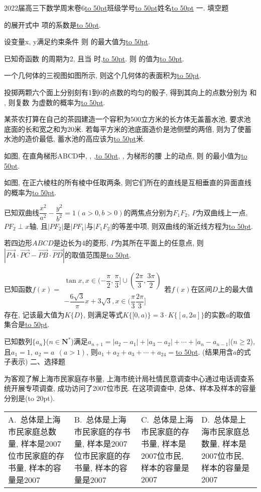 \documentclass[10pt,a4paper]{article}
\newcommand{\blank}[1]{\underline{\hbox to #1pt{}}}
\newcommand{\bracket}[1]{(\hbox to #1pt{})}
\newcommand{\fourch}[4]{\par\begin{tabular}{p{.23\textwidth}p{.23\textwidth}p{.23\textwidth}p{.23\textwidth}}
A.~#1 &B.~#2& C.~#3& D.~#4
\end{tabular}}
\begin{document}
2022届高三下数学周末卷6\blank{50}班级学号\blank{50}姓名\blank{50}
一. 填空题
\item 的展开式中 项的系数是\blank{50}.
\item 设变量x, y满足约束条件 则 的最大值为\blank{50}.
\item 已知奇函数 的周期为2, 且当 时,\blank{50}. 则 的值为\blank{50}.
\item 一个几何体的三视图如图所示, 则这个几何体的表面积为\blank{50}.
\item 投掷两颗六个面上分别刻有1到6的点数的均匀的骰子, 得到其向上的点数分别为 和 , 则复数  为虚数的概率为\blank{50}.
\item 某茶农打算在自己的茶园建造一个容积为500立方米的长方体无盖蓄水池, 要求池底面的长和宽之和为20米. 若每平方米的池底面造价是池侧壁的两倍, 则为了使蓄水池的造价最低, 蓄水池的高应该为\blank{50}米.
\item 如图, 在直角梯形ABCD中, , ,\blank{50}, , 为梯形的腰 上的动点, 则
 的最小值为\blank{50}.
\item 如图, 在正六棱柱的所有棱中任取两条, 则它们所在的直线是互相垂直的异面直线的概率为\blank{50}.
\item 已知双曲线$\dfrac{x^2}{a^2}-\dfrac{y^2}{b^2}=1(a>0,b>0)$的两焦点分别为$F_1F_2$, $P$为双曲线上一点, $PF_2\perp x$轴, 且$|PF_2|$是$|PF_1|$与$|F_1F_2|$的等差中项, 则双曲线的渐近线方程为\blank{50}.
\item 若四边形$ABCD$是边长为$4$的菱形, $P$为其所在平面上的任意点, 则$|\overrightarrow{PA}\cdot \overrightarrow{PC}-\overrightarrow{PB}\cdot \overrightarrow{PD}|$的取值范围是\blank{50}.
\item 已知函数$f(x)=\begin{matrix}
   \tan x, x\in (-\dfrac{\pi }2,\dfrac{\pi }3]\cup (\dfrac{2\pi }3,\dfrac{3\pi }2)  \\-\dfrac{6\sqrt 3}{\pi }x+3\sqrt 3,  x\in (\dfrac{\pi }3\dfrac{2\pi }3]  \end{matrix}$若$f(x)$在区间$D$上的最大值存在, 记该最大值为$K\{D\}$, 则满足等式$K\{[0,a)\}=3\cdot K\{[a,2a]\}$的实数$a$的取值集合是\blank{50}.
\item 已知数列$\{a_n\}$($n\in \mathbf{N}^*$)满足$a_{n+1}=|a_2-a_1|+|a_3-a_2|+\cdots +|a_n-a_{n-1}|$($n\ge 2$), 且$a_1=1$, $a_2=a\ \ (a>1)$, 则$a_1+a_2+a_3+\cdots +a_{24}=$\blank{50}. (结果用含$a$的式子表示)
二、选择题
\item 为客观了解上海市民家庭存书量, 上海市统计局社情民意调查中心通过电话调查系统开展专项调查, 成功访问了2007位市民. 在这项调查中, 总体、样本及样本的容量分别是\bracket{20}.
\fourch{总体是上海市民家庭总数量, 样本是2007位市民家庭的存书量, 样本的容量是2007}{总体是上海市民家庭的存书量, 样本是2007位市民家庭的存书量, 样本的容量是2007}{总体是上海市民家庭的存书量, 样本是2007位市民, 样本的容量是2007}{总体是上海市民家庭总数量, 样本是2007位市民, 样本的容量是2007}
\end{document}
